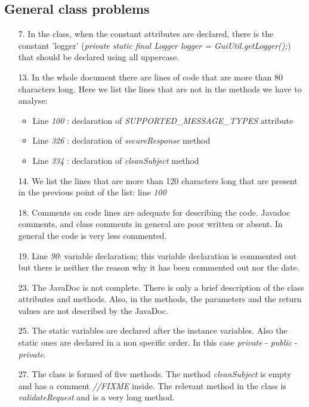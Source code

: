 \subsection{General class problems}
\label{ref-general}

\begin{itemize}
    \item[7.] 
        In the class, when the constant attributes are declared, there is the constant 'logger' (\textit{private static final Logger logger = GuiUtil.getLogger();}) that should be declared using all uppercase.
    \item[13.] 
        In the whole document there are lines of code that are more than 80 characters long. 
        \newline
        Here we list the lines that are not in the methods we have to analyse:
            \begin{itemize}
                \item Line \textit{100} : declaration of \textit{SUPPORTED\_MESSAGE\_TYPES} attribute
                \item Line \textit{326} : declaration of \textit{secureResponse} method
                \item Line \textit{334} : declaration of \textit{cleanSubject} method
            \end{itemize}
    \item[14.] 
        We list the lines that are more than 120 characters long that are present in the previous point of the list: line \textit{100}
    \item[18.] 
        Comments on code lines are adequate for describing the code. Javadoc comments, and class comments in general are poor written or absent. In general the code is very less commented.
    \item[19.] 
        Line \textit{90}: variable declaration; this variable declaration is commented out but there is neither the reason why it has been commented out nor the date.
    \item[23.] 
        The JavaDoc is not complete. There is only a brief description of the class attributes and methods. Also, in the methods, the parameters and the return values are not described by the JavaDoc.
    \item[25.] 
        The static variables are declared after the instance variables. Also the static ones are declared in a non specific order. In this case \textit{private} - \textit{public} - \textit{private}. 
    \item[27.] 
        The class is formed of five methods. The method \textit{cleanSubject} is empty and has a comment \textit{//FIXME} inside. The relevant method in the class is \textit{validateRequest} and is a very long method.
\end{itemize}